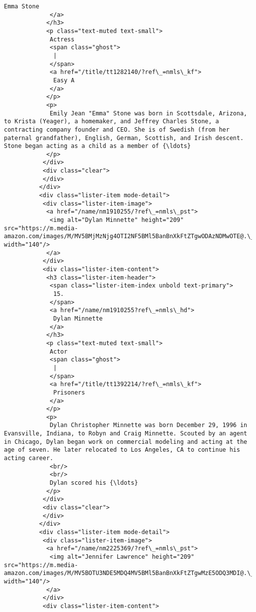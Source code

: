 \documentclass[11pt]{article}
\begin{document}
\begin{Verbatim}[commandchars=\\\{\}]
              Emma Stone
             </a>
            </h3>
            <p class="text-muted text-small">
             Actress
             <span class="ghost">
              |
             </span>
             <a href="/title/tt1282140/?ref\_=nmls\_kf">
              Easy A
             </a>
            </p>
            <p>
             Emily Jean "Emma" Stone was born in Scottsdale, Arizona, to Krista (Yeager), a homemaker, and Jeffrey Charles Stone, a contracting company founder and CEO. She is of Swedish (from her paternal grandfather), English, German, Scottish, and Irish descent. Stone began acting as a child as a member of {\ldots}
            </p>
           </div>
           <div class="clear">
           </div>
          </div>
          <div class="lister-item mode-detail">
           <div class="lister-item-image">
            <a href="/name/nm1910255/?ref\_=nmls\_pst">
             <img alt="Dylan Minnette" height="209" src="https://m.media-amazon.com/images/M/MV5BMjMzNjg4OTI2NF5BMl5BanBnXkFtZTgwODAzNDMwOTE@.\_V1\_UY209\_CR0,0,140,209\_AL\_.jpg" width="140"/>
            </a>
           </div>
           <div class="lister-item-content">
            <h3 class="lister-item-header">
             <span class="lister-item-index unbold text-primary">
              15.
             </span>
             <a href="/name/nm1910255?ref\_=nmls\_hd">
              Dylan Minnette
             </a>
            </h3>
            <p class="text-muted text-small">
             Actor
             <span class="ghost">
              |
             </span>
             <a href="/title/tt1392214/?ref\_=nmls\_kf">
              Prisoners
             </a>
            </p>
            <p>
             Dylan Christopher Minnette was born December 29, 1996 in Evansville, Indiana, to Robyn and Craig Minnette. Scouted by an agent in Chicago, Dylan began work on commercial modeling and acting at the age of seven. He later relocated to Los Angeles, CA to continue his acting career.
             <br/>
             <br/>
             Dylan scored his {\ldots}
            </p>
           </div>
           <div class="clear">
           </div>
          </div>
          <div class="lister-item mode-detail">
           <div class="lister-item-image">
            <a href="/name/nm2225369/?ref\_=nmls\_pst">
             <img alt="Jennifer Lawrence" height="209" src="https://m.media-amazon.com/images/M/MV5BOTU3NDE5MDQ4MV5BMl5BanBnXkFtZTgwMzE5ODQ3MDI@.\_V1\_UX140\_CR0,0,140,209\_AL\_.jpg" width="140"/>
            </a>
           </div>
           <div class="lister-item-content">

\end{Verbatim}
\end{document}
